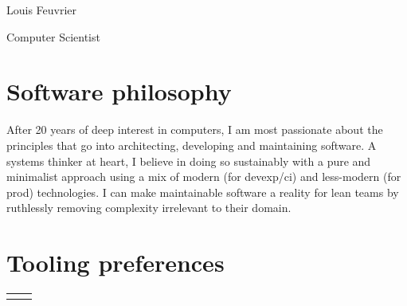 \documentclass[
	10pt, %
]{freemancv}
\begin{document}
\begin{paracol}{2} %

\parbox[][0.11\textheight][c]{\linewidth}{ %
	\centering %

	{\sffamily\Huge Louis Feuvrier} %

	\medskip %

	{\textcolor{headings}{Computer Scientist}}

	\medskip %


	\vfill %
}

\section{Software philosophy}
After 20 years of deep interest in computers, I am most passionate about the
principles that go into architecting, developing and maintaining software. A
systems thinker at heart, I believe in doing so sustainably with a pure and
minimalist approach using a mix of modern (for devexp/ci) and less-modern
(for prod) technologies. I can make maintainable software a reality for lean
teams by ruthlessly removing complexity irrelevant to their domain.

\section{Tooling preferences}
\begin{supertabular}{r l} %
\end{supertabular}


\end{paracol}
\end{document}
